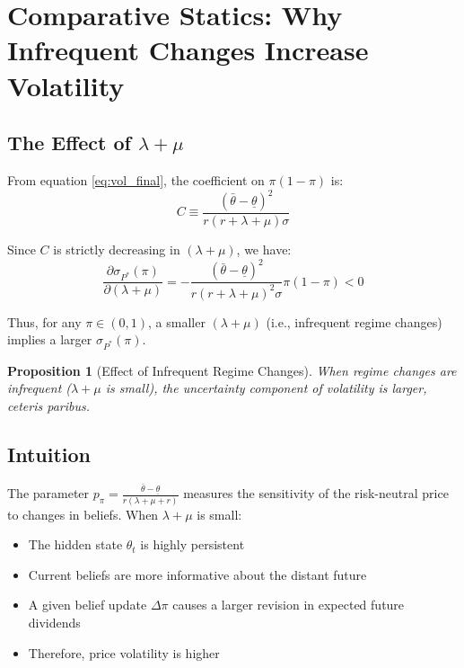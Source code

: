 \documentclass[12pt]{article}
\newtheorem{proposition}{Proposition}
\begin{document}
\section{Comparative Statics: Why Infrequent Changes Increase Volatility}

\subsection{The Effect of $\lambda + \mu$}

From equation \eqref{eq:vol_final}, the coefficient on $\pi(1-\pi)$ is:
\begin{equation}
C \equiv \frac{(\bar{\theta} - \underline{\theta})^2}{r(r + \lambda + \mu)\sigma}
\end{equation}

Since $C$ is strictly decreasing in $(\lambda + \mu)$, we have:
\begin{equation}
\frac{\partial \sigma_{P^*}(\pi)}{\partial (\lambda + \mu)} = -\frac{(\bar{\theta} - \underline{\theta})^2}{r(r + \lambda + \mu)^2\sigma} \pi(1-\pi) < 0
\end{equation}

Thus, for any $\pi \in (0,1)$, a smaller $(\lambda + \mu)$ (i.e., infrequent regime changes) implies a larger $\sigma_{P^*}(\pi)$.

\begin{proposition}[Effect of Infrequent Regime Changes]
When regime changes are infrequent ($\lambda + \mu$ is small), the uncertainty component of volatility is larger, ceteris paribus.
\end{proposition}

\subsection{Intuition}

The parameter $p_\pi = \frac{\bar{\theta} - \underline{\theta}}{r(\lambda + \mu + r)}$ measures the sensitivity of the risk-neutral price to changes in beliefs. When $\lambda + \mu$ is small:
\begin{itemize}
    \item The hidden state $\theta_t$ is highly persistent
    \item Current beliefs are more informative about the distant future
    \item A given belief update $\Delta\pi$ causes a larger revision in expected future dividends
    \item Therefore, price volatility is higher
\end{itemize}
\end{document}
